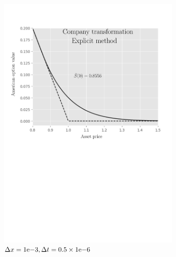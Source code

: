 \begin{figure}[tbp]
\begin{subfigure}{0.4\textwidth}
    \includegraphics[width=\textwidth]{chapters/chapter3/TestCase3ExplicitCompany.pdf}
    \caption{$\Delta{x}={1}\mathrm{e}{-3}, \Delta{t}=0.5\times{1}\mathrm{e}{-6}$}
    \label{fig:finitedifferencesschemes:numericaresults:test_case_4_explicit_company}
  \end{subfigure}
  \begin{subfigure}{0.4\textwidth}
    \centering

\end{subfigure}
\end{figure}
